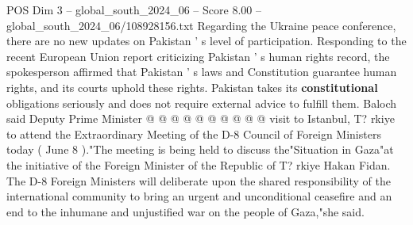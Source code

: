\begin{textsample}{POS Dim 3 – global\_south\_2024\_06 – Score 8.00 – global\_south\_2024\_06/108928156.txt}
Regarding the Ukraine peace conference, there are no new updates on Pakistan ' s level of participation.
Responding to the recent European Union report criticizing Pakistan ' s human rights record, the spokesperson affirmed that Pakistan ' s laws and Constitution guarantee human rights, and its courts uphold these rights.
Pakistan takes its \textbf{constitutional} obligations seriously and does not require external advice to fulfill them.
Baloch said Deputy Prime Minister @ @ @ @ @ @ @ @ @ @ visit to Istanbul, T? rkiye to attend the Extraordinary Meeting of the D-8 Council of Foreign Ministers today ( June 8 )."The meeting is being held to discuss the"Situation in Gaza"at the initiative of the Foreign Minister of the Republic of T? rkiye Hakan Fidan.
The D-8 Foreign Ministers will deliberate upon the shared responsibility of the international community to bring an urgent and unconditional ceasefire and an end to the inhumane and unjustified war on the people of Gaza,"she said.

\end{textsample}
